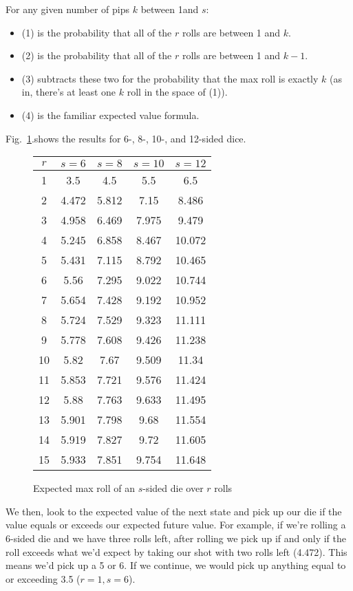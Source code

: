 \documentclass[11pt, oneside]{article} 	%
\begin{document}
For any given number of pips $k$ between 1and $s$:
\begin{itemize}
\item (1) is the probability that all of the $r$ rolls are between 1 and $k$.
\item (2) is the probability that all of the $r$ rolls are between 1 and $k-1$.
\item (3) subtracts these two for the probability that the max roll is exactly $k$ (as in, there's at least one $k$ roll in the space of (1)).
\item (4) is the familiar expected value formula.
\end{itemize}

 Fig.~\ref{fig:max-rolls}.shows the results for 6-, 8-, 10-, and 12-sided dice.

\begin{figure}[!htb]
\centering
\begin{tabular}{c | c c c c}
$r$ & $s=6$ & $s=8$  & $s=10$ & $s=12$  \\
\hline
1 & 3.5 & 4.5 & 5.5 & 6.5 \\
2 & 4.472 & 5.812 & 7.15 & 8.486 \\
3 & 4.958 & 6.469 & 7.975 & 9.479 \\
4 & 5.245 & 6.858 & 8.467 & 10.072 \\
5 & 5.431 & 7.115 & 8.792 & 10.465 \\
6 & 5.56 & 7.295 & 9.022 & 10.744 \\
7 & 5.654 & 7.428 & 9.192 & 10.952 \\
8 & 5.724 & 7.529 & 9.323 & 11.111 \\
9 & 5.778 & 7.608 & 9.426 & 11.238 \\
10 & 5.82 & 7.67 & 9.509 & 11.34 \\
11 & 5.853 & 7.721 & 9.576 & 11.424 \\
12 & 5.88 & 7.763 & 9.633 & 11.495 \\
13 & 5.901 & 7.798 & 9.68 & 11.554 \\
14 & 5.919 & 7.827 & 9.72 & 11.605 \\
15 & 5.933 & 7.851 & 9.754 & 11.648 \\
\end{tabular}
\caption{Expected max roll of an $s$-sided die over $r$ rolls}
\label{fig:max-rolls}
\end{figure}

We then, look to the expected value of the next state and pick up our die if the value equals or exceeds our expected future value.  For example, if we're rolling a 6-sided die and we have three rolls left, after rolling we pick up if and only if the roll exceeds what we'd expect by taking our shot with two rolls left (4.472).  This means we'd pick up a 5 or 6.  If we continue, we would pick up anything equal to or exceeding 3.5 ($r=1, s=6$).
\end{document}
